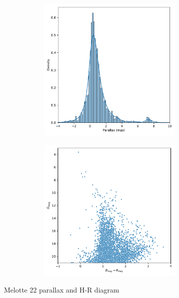\documentclass[11pt, a4paper, english]{book}
\begin{document}
\begin{figure}[htbp]
  \centering
  \begin{subfigure}{0.9\textwidth}
    \centering
    \begin{subfigure}[t]{0.45\textwidth}
      \centering
      \includegraphics[width=\textwidth]{../figures/raw_parallax_melotte_22.pdf}
    \end{subfigure}
    \hfill
    \begin{subfigure}[t]{0.45\textwidth}
      \centering
      \includegraphics[width=\textwidth]{../figures/raw_hr_diagram_melotte_22.pdf}
    \end{subfigure}
  \end{subfigure}
  \caption{Melotte 22 parallax and H-R diagram}
  \label{fig:raw_parallax_hr_diagram_mellote_22}
\end{figure}
\end{document}
